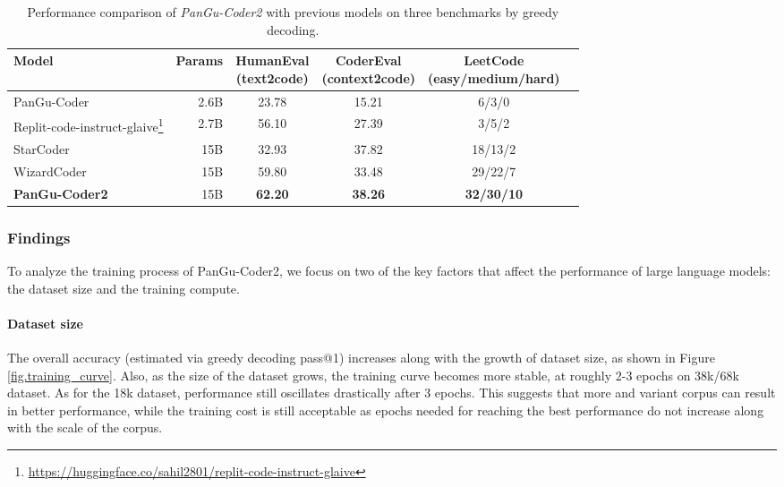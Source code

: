 \documentclass{article}
\newcommand{\pgcoder}{PanGu-Coder2\xspace}
\begin{document}
\begin{table}
	\caption{Performance comparison of \textit{\pgcoder} with previous models on three benchmarks by greedy decoding.}
	\centering
	\begin{tabular}{lrcccc}
		\toprule
		Model  & Params & \makecell{HumanEval \\ (text2code)}     & \makecell{CoderEval\\ (context2code)} & \makecell{LeetCode\\ (easy/medium/hard)} \\
		\midrule
            PanGu-Coder 	& 2.6B & 23.78 & 15.21  &  6/3/0  \\
            Replit-code-instruct-glaive\footnote{\url{https://huggingface.co/sahil2801/replit-code-instruct-glaive}} & 2.7B & 56.10 & 27.39  & 3/5/2\\
		StarCoder  & 15B  & 32.93 & 37.82  & 18/13/2       \\
  		WizardCoder  & 15B & 59.80 & 33.48  & 29/22/7      \\
            \textbf{\pgcoder} & 15B & \textbf{62.20} & \textbf{38.26} & \textbf{32/30/10}\\
		\bottomrule
	\end{tabular}
	\label{tab.pass1-greedy-decoding}
\end{table}

\subsubsection{Findings}
To analyze the training process of \pgcoder, we focus on two of the key factors that affect the performance of large language models: the dataset size and the training compute.

\paragraph{Dataset size}
The overall accuracy (estimated via greedy decoding pass@1) increases along with the growth of dataset size, as shown in Figure \ref{fig.training_curve}.
Also, as the size of the dataset grows, the training curve becomes more stable, at roughly 2-3 epochs on 38k/68k dataset. As for the 18k dataset, performance still oscillates drastically after 3 epochs.
This suggests that more and variant corpus can result in better performance, while the training cost is still acceptable as epochs needed for reaching the best performance do not increase along with the scale of the corpus. 
\end{document}
